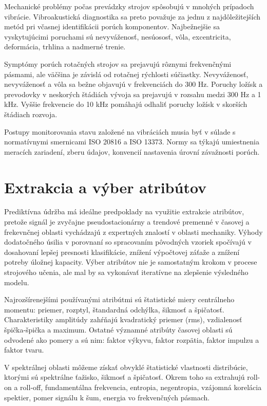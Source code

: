Mechanické problémy počas prevádzky strojov spôsobujú v mnohých prípadoch vibrácie. Vibroakustická diagnostika sa preto považuje za jednu z najdôležitejších metód pri včasnej identifikácii porúch komponentov. Najbežnejšie sa vyskytujúcimi poruchami sú nevyváženosť, nesúososť, vôla, excentricita, deformácia, trhlina a nadmerné trenie. 

Symptómy porúch rotačných strojov sa prejavujú rôznymi frekvenčnými pásmami, ale väčšina je závislá od rotačnej rýchlosti súčiastky. Nevyváženosť, nevyváženosť a vôla sa bežne objavujú v frekvenciách do 300 Hz. Poruchy ložísk a prevodovky v neskorých štádiách vývoja sa prejavujú v rozsahu medzi 300 Hz a 1 kHz. Vyššie frekvencie do 10 kHz pomáhajú odhaliť poruchy ložísk v skorších štádiach rozvoja.

Postupy monitorovania stavu založené na vibráciách musia byť v súlade s normatívnymi smernicami ISO 20816 a ISO 13373. Normy sa týkajú umiestnenia meracích zariadení, zberu údajov, konvencií nastavenia úrovní závažnosti porúch. 


\section{Extrakcia a výber atribútov}
Prediktívna údržba má ideálne predpoklady na využitie extrakcie atribútov, pretože signál je zvyčajne pseudostacionárny a trendové premenné v časovej a frekevnčnej oblasti vychádzajú z expertných znalostí v oblasti mechaniky. Výhody dodatočného úsilia v porovnaní so spracovaním pôvodných vzoriek spočívajú v dosahovaní lepšej presnosti klasifikácie, znížení výpočtovej záťaže a znížení potreby úložnej kapacity. Výber atribútov nie je samostatným krokom v procese strojového učenia, ale mal by sa vykonávať iteratívne na zlepšenie výsledného modelu.

Najrozšírenejšími používanými atribútmi sú štatistické miery centrálneho momentu: priemer, rozptyl, štandardná odchýlka, šikmosť a špičatosť. Charakteristiky amplitúdy zahŕňajú kvadratický priemer (rms), vzdialenosť špička-špička a maximum. Ostatné významné atribúty časovej oblasti sú odvodené ako pomery a sú nim: faktor výkyvu, faktor rozpätia, faktor impulzu a faktor tvaru.  

V spektrálnej oblasti môžeme získať obvyklé štatistické vlastnosti distribúcie, ktorými sú spektrálne ťažisko, šikmosť a špičatosť. Okrem toho sa extrahujú roll-on a roll-off, fundamentálna frekvencia, entropia, negentropia, vzájomná korelácia spektier, pomer signálu k šum, energia vo frekvenčných pásmach.

